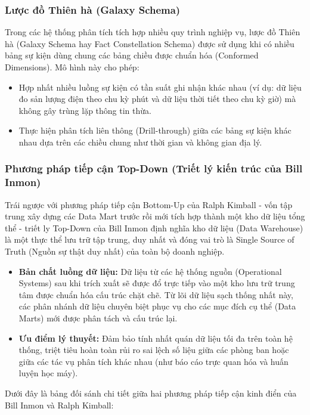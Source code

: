 \documentclass[12pt,a4paper]{article}
\begin{document}
\subsubsection{Lược đồ Thiên hà (Galaxy Schema)}
Trong các hệ thống phân tích tích hợp nhiều quy trình nghiệp vụ, lược đồ Thiên hà (Galaxy Schema hay Fact Constellation Schema) được sử dụng khi có nhiều bảng sự kiện dùng chung các bảng chiều được chuẩn hóa (Conformed Dimensions). Mô hình này cho phép:
\begin{itemize}
    \item Hợp nhất nhiều luồng sự kiện có tần suất ghi nhận khác nhau (ví dụ: dữ liệu đo sản lượng điện theo chu kỳ phút và dữ liệu thời tiết theo chu kỳ giờ) mà không gây trùng lặp thông tin thừa.
    \item Thực hiện phân tích liên thông (Drill-through) giữa các bảng sự kiện khác nhau dựa trên các chiều chung như thời gian và không gian địa lý.
\end{itemize}

\subsubsection{Phương pháp tiếp cận Top-Down (Triết lý kiến trúc của Bill Inmon)}
Trái ngược với phương pháp tiếp cận Bottom-Up của Ralph Kimball - vốn tập trung xây dựng các Data Mart trước rồi mới tích hợp thành một kho dữ liệu tổng thể - triết ly Top-Down của Bill Inmon định nghĩa kho dữ liệu (Data Warehouse) là một thực thể lưu trữ tập trung, duy nhất và đóng vai trò là Single Source of Truth (Nguồn sự thật duy nhất) của toàn bộ doanh nghiệp.
\begin{itemize}
    \item \textbf{Bản chất luồng dữ liệu:} Dữ liệu từ các hệ thống nguồn (Operational Systems) sau khi trích xuất sẽ được đổ trực tiếp vào một kho lưu trữ trung tâm được chuẩn hóa cấu trúc chặt chẽ. Từ lõi dữ liệu sạch thống nhất này, các phân nhánh dữ liệu chuyên biệt phục vụ cho các mục đích cụ thể (Data Marts) mới được phân tách và cấu trúc lại.
    \item \textbf{Ưu điểm lý thuyết:} Đảm bảo tính nhất quán dữ liệu tối đa trên toàn hệ thống, triệt tiêu hoàn toàn rủi ro sai lệch số liệu giữa các phòng ban hoặc giữa các tác vụ phân tích khác nhau (như báo cáo trực quan hóa và huấn luyện học máy).
\end{itemize}


Dưới đây là bảng đối sánh chi tiết giữa hai phương pháp tiếp cận kinh điển của Bill Inmon và Ralph Kimball:
\vspace{1em}
\renewcommand{\arraystretch}{1.5} 
\end{document}
